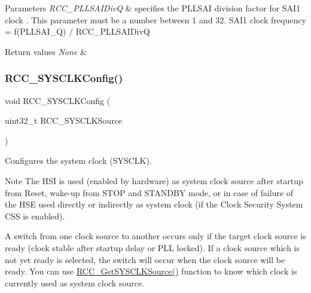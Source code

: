 \begin{DoxyParams}{Parameters}
{\em R\+C\+C\+\_\+\+P\+L\+L\+S\+A\+I\+DivQ} & specifies the P\+L\+L\+S\+AI division factor for S\+A\+I1 clock . This parameter must be a number between 1 and 32. S\+A\+I1 clock frequency = f(\+P\+L\+L\+S\+A\+I\+\_\+\+Q) / R\+C\+C\+\_\+\+P\+L\+L\+S\+A\+I\+DivQ ~\newline
 \\
\hline
\end{DoxyParams}

\begin{DoxyRetVals}{Return values}
{\em None} & \\
\hline
\end{DoxyRetVals}
\mbox{\label{group___r_c_c_ga3551a36a8f0a3dc96a74d6b939048337}} 
\subsubsection{\texorpdfstring{R\+C\+C\+\_\+\+S\+Y\+S\+C\+L\+K\+Config()}{RCC\_SYSCLKConfig()}}
{\footnotesize\ttfamily void R\+C\+C\+\_\+\+S\+Y\+S\+C\+L\+K\+Config (\begin{DoxyParamCaption}\item[{uint32\+\_\+t}]{R\+C\+C\+\_\+\+S\+Y\+S\+C\+L\+K\+Source }\end{DoxyParamCaption})}



Configures the system clock (S\+Y\+S\+C\+LK). 

\begin{DoxyNote}{Note}
The H\+SI is used (enabled by hardware) as system clock source after startup from Reset, wake-\/up from S\+T\+OP and S\+T\+A\+N\+D\+BY mode, or in case of failure of the H\+SE used directly or indirectly as system clock (if the Clock Security System C\+SS is enabled). 

A switch from one clock source to another occurs only if the target clock source is ready (clock stable after startup delay or P\+LL locked). If a clock source which is not yet ready is selected, the switch will occur when the clock source will be ready. You can use \mbox{\hyperlink{group___r_c_c___group2_gaaeb32311c208b2a980841c9c884a41ea}{R\+C\+C\+\_\+\+Get\+S\+Y\+S\+C\+L\+K\+Source()}} function to know which clock is currently used as system clock source. 
\end{DoxyNote}

